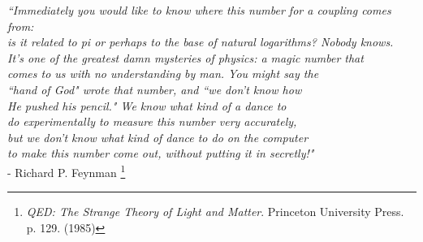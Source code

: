 \vfill

\begin{flushright}
\emph{
``Immediately you would like to know where this number for a coupling comes from:\\ 
is it related to pi or perhaps to the base of natural logarithms? Nobody knows.\\
It's one of the greatest damn mysteries of physics: a magic number that\\
comes to us with no understanding by man.
	You might say the \\
``hand of God" wrote that number, and ``we don't know how\\
He pushed his pencil." We know what kind of a dance to\\
 do experimentally to measure this number very accurately,\\
  but we don't know what kind of dance to do on the computer\\
to make this number come out, without putting it in secretly!"}\\
- Richard P.
	Feynman \footnote{\emph{QED: The Strange Theory of Light and Matter}.
	Princeton University Press.
	p.
	129.
	(1985)}
\end{flushright}




	 



	

